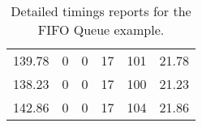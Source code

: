 \begin{table}[h]
{\begin{tabular}{cccccc}
            139.78             & 0                          & 0                          & 17                         & 101                        & 21.78                  \\
            138.23             & 0                          & 0                          & 17                         & 100                        & 21.23                  \\
            142.86             & 0                          & 0                          & 17                         & 104                        & 21.86                  \\
            \bottomrule
        \end{tabular}
    }
    \caption{Detailed timings reports for the FIFO Queue example.}
\end{table}



